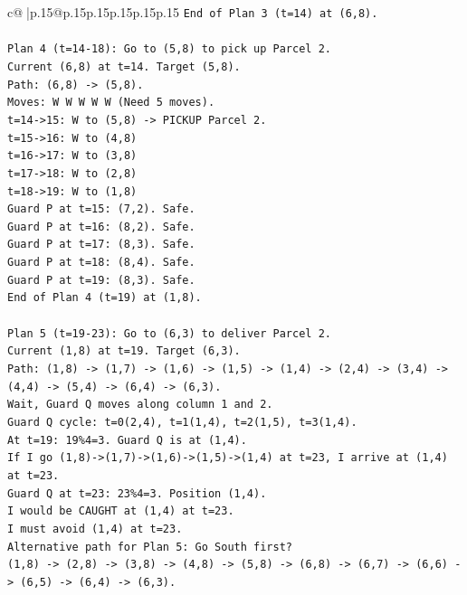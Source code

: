 \documentclass{article}
\begin{document}
{\begin{supertabular}{c@{$\;$}|p{.15\linewidth}@{}p{.15\linewidth}p{.15\linewidth}p{.15\linewidth}p{.15\linewidth}p{.15\linewidth}}
{{{\texttt{End of Plan 3 (t=14) at (6,8).} \\
\\ 
\texttt{Plan 4 (t=14{-}18): Go to (5,8) to pick up Parcel 2.} \\
\texttt{Current (6,8) at t=14. Target (5,8).} \\
\texttt{Path: (6,8) {-}> (5,8).} \\
\texttt{Moves: W W W W W (Need 5 moves).} \\
\texttt{t=14{-}>15: W to (5,8) {-}> PICKUP Parcel 2.} \\
\texttt{t=15{-}>16: W to (4,8)} \\
\texttt{t=16{-}>17: W to (3,8)} \\
\texttt{t=17{-}>18: W to (2,8)} \\
\texttt{t=18{-}>19: W to (1,8)} \\
\texttt{Guard P at t=15: (7,2). Safe.} \\
\texttt{Guard P at t=16: (8,2). Safe.} \\
\texttt{Guard P at t=17: (8,3). Safe.} \\
\texttt{Guard P at t=18: (8,4). Safe.} \\
\texttt{Guard P at t=19: (8,3). Safe.} \\
\texttt{End of Plan 4 (t=19) at (1,8).} \\
\\ 
\texttt{Plan 5 (t=19{-}23): Go to (6,3) to deliver Parcel 2.} \\
\texttt{Current (1,8) at t=19. Target (6,3).} \\
\texttt{Path: (1,8) {-}> (1,7) {-}> (1,6) {-}> (1,5) {-}> (1,4) {-}> (2,4) {-}> (3,4) {-}> (4,4) {-}> (5,4) {-}> (6,4) {-}> (6,3).} \\
\texttt{Wait, Guard Q moves along column 1 and 2.} \\
\texttt{Guard Q cycle: t=0(2,4), t=1(1,4), t=2(1,5), t=3(1,4).} \\
\texttt{At t=19: 19\%4=3. Guard Q is at (1,4).} \\
\texttt{If I go (1,8){-}>(1,7){-}>(1,6){-}>(1,5){-}>(1,4) at t=23, I arrive at (1,4) at t=23.} \\
\texttt{Guard Q at t=23: 23\%4=3. Position (1,4).} \\
\texttt{I would be CAUGHT at (1,4) at t=23.} \\
\texttt{I must avoid (1,4) at t=23.} \\
\texttt{Alternative path for Plan 5: Go South first?} \\
\texttt{(1,8) {-}> (2,8) {-}> (3,8) {-}> (4,8) {-}> (5,8) {-}> (6,8) {-}> (6,7) {-}> (6,6) {-}> (6,5) {-}> (6,4) {-}> (6,3).} \\
}}}
\end{supertabular}}
\end{document}
